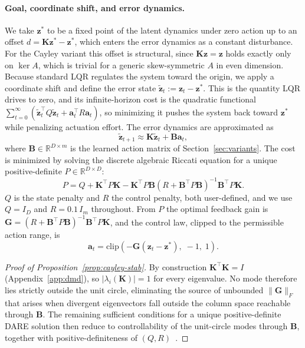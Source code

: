 \documentclass[10pt]{article} %
\newcommand{\K}{\mathbf{K}}
\newcommand{\B}{\mathbf{B}}
\newcommand{\z}{\bm{z}}
\begin{document}
\paragraph{Goal, coordinate shift, and error dynamics.}
We take $\z^*$ to be a fixed point of the latent dynamics under zero action up to an offset $d = \K\z^* - \z^*$, which enters the error dynamics as a constant disturbance. For the Cayley variant this offset is structural, since $\K\z = \z$ holds exactly only on $\ker A$, which is trivial for a generic skew-symmetric $A$ in even dimension. Because standard LQR regulates the system toward the origin, we apply a coordinate shift and define the error state $\tilde{\z}_t := \z_t - \z^*$. This is the quantity LQR drives to zero, and its infinite-horizon cost is the quadratic functional $\sum_{t=0}^{\infty}(\tilde{\z}_t^\top Q \tilde{\z}_t + \mathbf{a}_t^\top R \mathbf{a}_t)$, so minimizing it pushes the system back toward $\z^*$ while penalizing actuation effort. The error dynamics are approximated as
\begin{equation}
  \tilde{\z}_{t+1} \approx \K\tilde{\z}_t + \B\mathbf{a}_t,
  \label{eq:error_dynamics}
\end{equation}
where $\B \in \mathbb{R}^{D \times m}$ is the learned action matrix of Section~\ref{sec:variants}. The cost is minimized by solving the discrete algebraic Riccati equation for a unique positive-definite $P \in \mathbb{R}^{D \times D}$:
\begin{equation}
P = Q + \K^\top P \K - \K^\top P \B (R + \B^\top P \B)^{-1} \B^\top P \K.
\label{eq:dare}
\end{equation}
$Q$ is the state penalty and $R$ the control penalty, both user-defined, and we use $Q = I_D$ and $R = 0.1\,I_m$ throughout. From $P$ the optimal feedback gain is $\mathbf{G} = (R + \B^\top P \B)^{-1} \B^\top P \K$, and the control law, clipped to the permissible action range, is
\begin{equation}
  \mathbf{a}_t = \mathrm{clip}(-\mathbf{G}(\z_t - \z^*),\; -1,\; 1).
  \label{eq:lqr_law}
\end{equation}

\begin{proof}[Proof of Proposition~\ref{prop:cayley-stab}]
By construction $\K^\top \K = I$ (Appendix~\ref{app:dmd}), so $|\lambda_i(\K)| = 1$ for every eigenvalue. No mode therefore lies strictly outside the unit circle, eliminating the source of unbounded $\|\mathbf{G}\|_F$ that arises when divergent eigenvectors fall outside the column space reachable through $\B$. The remaining sufficient conditions for a unique positive-definite DARE solution then reduce to controllability of the unit-circle modes through $\B$, together with positive-definiteness of $(Q, R)$~\citep{Lancaster1995}.
\end{proof}
\end{document}
